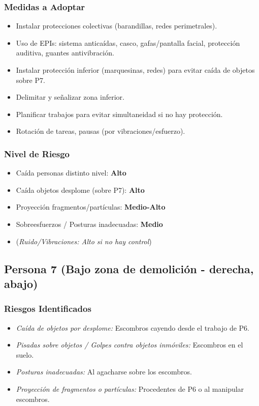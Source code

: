 \documentclass[12pt,a4paper]{article}
\begin{document}
	\subsubsection{Medidas a Adoptar}
	\begin{itemize}
		\item Instalar protecciones colectivas (barandillas, redes perimetrales).
		\item Uso de EPIs: sistema anticaídas, casco, gafas/pantalla facial, protección auditiva, guantes antivibración.
		\item Instalar protección inferior (marquesinas, redes) para evitar caída de objetos sobre P7.
		\item Delimitar y señalizar zona inferior.
		\item Planificar trabajos para evitar simultaneidad si no hay protección.
		\item Rotación de tareas, pausas (por vibraciones/esfuerzo).
	\end{itemize}
	
	\subsubsection{Nivel de Riesgo}
	\begin{itemize}
		\item Caída personas distinto nivel: \textbf{Alto}
		\item Caída objetos desplome (sobre P7): \textbf{Alto}
		\item Proyección fragmentos/partículas: \textbf{Medio-Alto}
		\item Sobreesfuerzos / Posturas inadecuadas: \textbf{Medio}
		\item (\textit{Ruido/Vibraciones: Alto si no hay control})
	\end{itemize}
	
	\bigskip\hrulefill\bigskip
	
	\subsection{Persona 7 (Bajo zona de demolición - derecha, abajo)}
	
	\subsubsection{Riesgos Identificados}
	\begin{itemize}
		\item \textit{Caída de objetos por desplome:} Escombros cayendo desde el trabajo de P6.
		\item \textit{Pisadas sobre objetos / Golpes contra objetos inmóviles:} Escombros en el suelo.
		\item \textit{Posturas inadecuadas:} Al agacharse sobre los escombros.
		\item \textit{Proyección de fragmentos o partículas:} Procedentes de P6 o al manipular escombros.
	\end{itemize}
	
\end{document}
